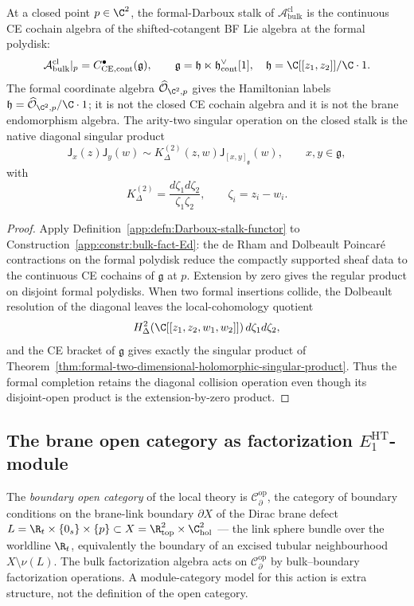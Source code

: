 \begin{prop}\label{app:prop:bulk-stalk}
At a closed point $p\in\C^2$, the formal-Darboux stalk of
$\mathcal A^{\mathrm{cl}}_{\mathrm{bulk}}$ is the continuous CE cochain
algebra of the shifted-cotangent BF Lie algebra at the formal polydisk:
\[
  \mathcal A^{\mathrm{cl}}_{\mathrm{bulk}}|_p
   =C^\bullet_{\mathrm{CE},\mathrm{cont}}(\mathfrak g),
   \qquad
   \mathfrak g=\mathfrak h\ltimes\mathfrak h^\vee_{\mathrm{cont}}[1],
   \quad
   \mathfrak h=\C[[z_1,z_2]]/\C\cdot 1.
\]
The formal coordinate algebra
\(\widehat{\mathcal O}_{\C^2,p}\) gives the Hamiltonian labels
\(\mathfrak h=\widehat{\mathcal O}_{\C^2,p}/\C\cdot1\); it is not the
closed CE cochain algebra and it is not the brane endomorphism
algebra.  The arity-two singular operation on the closed stalk is the
native diagonal singular product
\[
  \mathsf{J}_x(z)\mathsf{J}_y(w)
  \sim
  K^{(2)}_\Delta(z,w)\mathsf{J}_{[x,y]_{\mathfrak g}}(w),
  \qquad x,y\in\mathfrak g,
\]
with
\[
  K^{(2)}_\Delta=\frac{d\zeta_1d\zeta_2}{\zeta_1\zeta_2},\qquad
  \zeta_i=z_i-w_i .
\]
\end{prop}

\begin{proof}
Apply Definition~\ref{app:defn:Darboux-stalk-functor} to
Construction~\ref{app:constr:bulk-fact-Ed}: the de Rham and Dolbeault
Poincar\'e contractions on the formal polydisk reduce the compactly
supported sheaf data to the continuous CE cochains of $\mathfrak g$ at
$p$.  Extension by zero gives the regular product on disjoint formal
polydisks.  When two formal insertions collide, the Dolbeault
resolution of the diagonal leaves the local-cohomology quotient
\[
  H^2_\Delta(\C[[z_1,z_2,w_1,w_2]])\,d\zeta_1d\zeta_2,
\]
and the CE bracket of $\mathfrak g$ gives exactly the singular product
of Theorem~\ref{thm:formal-two-dimensional-holomorphic-singular-product}.  Thus the
formal completion retains the diagonal collision operation even though
its disjoint-open product is the extension-by-zero product.
\end{proof}

\subsection{The brane open category as factorization
\texorpdfstring{$E_1^{\mathrm{HT}}$}{E1-HT}-module}\label{app:hfc:brane-as-fact-cat}

\begin{defn}\label{app:defn:brane-cat}
The \emph{boundary open category} of the local theory is
\(\mathcal{C}^{\mathrm{op}}_\partial\), the category of boundary
conditions on the brane-link boundary $\partial X$ of the Dirac brane
defect
$L=\R_t\times\{0_s\}\times\{p\}
\subset X=\R^2_{\mathrm{top}}\times\C^2_{\mathrm{hol}}$
--- the link sphere bundle over the worldline $\R_t$, equivalently the
boundary of an excised tubular neighbourhood
$X\setminus\nu(L)$.  The bulk factorization algebra acts on
\(\mathcal{C}^{\mathrm{op}}_\partial\) by bulk--boundary
factorization operations.  A
module-category model for this action is extra structure, not the
definition of the open category.
\end{defn}


